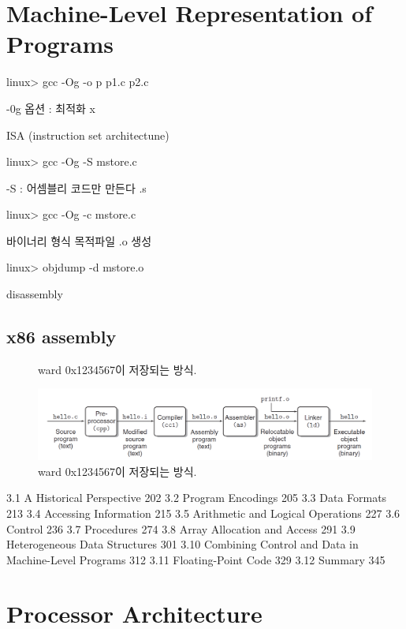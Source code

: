 \documentclass[chapter,oneside]{oblivoir}
\begin{document}
\chapter{Machine-Level Representation of Programs}


linux> gcc -Og -o p p1.c p2.c


-0g 옵션 : 최적화 x

ISA (instruction set architectune)

linux> gcc -Og -S mstore.c

-S : 어셈블리 코드만 만든다 .s

linux> gcc -Og -c mstore.c

바이너리 형식 목적파일 .o  생성


linux> objdump -d mstore.o

disassembly


\section{x86 assembly}


\begin{figure}[h!]
    \centering
    \caption{ward 0x1234567이 저장되는 방식.}
\end{figure}




\begin{figure}[h!]
    \centering
    \includegraphics[scale=0.5]{pic/pic1}
    \caption{ward 0x1234567이 저장되는 방식.}
\end{figure}





3.1 A Historical Perspective 202
3.2 Program Encodings 205
3.3 Data Formats 213
3.4 Accessing Information 215
3.5 Arithmetic and Logical Operations 227
3.6 Control 236
3.7 Procedures 274
3.8 Array Allocation and Access 291
3.9 Heterogeneous Data Structures 301
3.10 Combining Control and Data in Machine-Level Programs 312
3.11 Floating-Point Code 329
3.12 Summary 345

\chapter{Processor Architecture}
\end{document}
